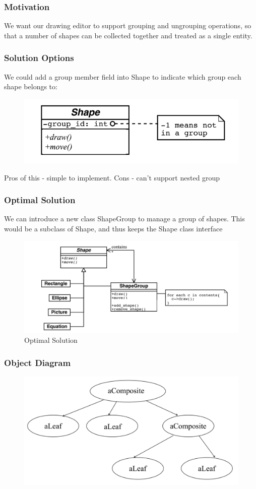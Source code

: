 \documentclass{article}
\begin{document}
\subsubsection*{Motivation}
We want our drawing editor to support grouping and ungrouping operations, so that a number of shapes can be collected together and treated as a single entity.
\subsubsection*{Solution Options}
We could add a group member field into Shape to indicate which group each shape belongs to:
\begin{figure}[H]
    \centering
    \includegraphics[width=0.6\linewidth]{Pictures/Screenshot 2023-02-05 at 12.27.22.png}
\end{figure}
Pros of this - simple to implement. Cons - can't support nested group
\subsubsection*{Optimal Solution}
We can introduce a new class ShapeGroup to manage a group of shapes. This would be a subclass of Shape, and thus keeps the Shape class interface
\begin{figure}[H]
    \centering
    \includegraphics[width=0.8\linewidth]{Pictures/Screenshot 2023-02-05 at 12.29.32.png}
    \caption{Optimal Solution}
\end{figure}
\subsubsection*{Object Diagram}
\begin{figure}[H]
    \centering
    \includegraphics[width=0.6\linewidth]{Pictures/Screenshot 2023-02-05 at 12.30.50.png}
\end{figure}
\end{document}

